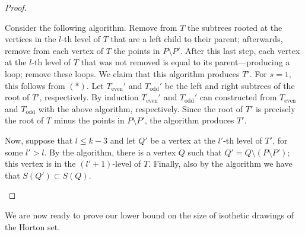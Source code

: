 \documentclass{article}
\begin{document}
\begin{proof}
\begin{itemize}
Consider the following algorithm. Remove from $T$ the subtrees rooted at the vertices in the $l$-th level of $T$ that
are a left child to their parent; afterwards, remove from each vertex of $T$ the points in $P \setminus P'$. After this last 
  step, each vertex at the $l$-th level of $T$  that was not removed is equal to its parent---producing a loop;
  remove these loops. We claim that this algorithm produces $T'$. For $s=1$, this follows from $(\ast)$. 
  Let  $T_{\textrm{even}}'$ and $T_{\textrm{odd}}'$ be the left and right
  subtrees of the root of $T'$, respectively.
  By induction $T_{\textrm{even}}'$ and $T_{\textrm{odd}}'$ can  constructed from
  $T_{\textrm{even}}$ and $T_{\textrm{odd}}$ with the above algorithm, respectively.
  Since the root of $T'$ is precisely the root of $T$ minus the points in $P \setminus P'$,
  the algorithm produces $T'$.
  
  Now, suppose that $l \le k-3$ and let $Q'$ be a vertex at the $l'$-th level of $T'$, for
  some $l'>l$. By
  the algorithm, there is a vertex $Q$ such that $Q'=Q\setminus (P \setminus P')$;
  this vertex is in the $(l'+1)$-level of $T$. Finally, also by the algorithm
  we have that $S(Q') \subset S(Q)$.
\end{itemize}
\end{proof}

We are now ready to prove our lower bound on the size of isothetic drawings of the Horton set.
\end{document}

